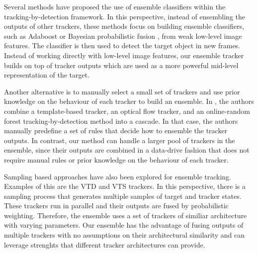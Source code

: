 Several methods have proposed the use of ensemble classifiers within
the tracking-by-detection framework.
In this perspective, instead of ensembling the outputs of other trackers,
these methods focus on building ensemble classifiers,
such as Adaboost \cite{Avidan2007} or Bayesian probabilistic fusion \cite{Bai2013},
from weak low-level image features.
The classifier is then used to detect the target object in
new frames. Instead of working directly with low-level image features,
our ensemble tracker builds on top of tracker outputs
which are used as a more powerful mid-level representation of the target.

Another alternative is to manually select a small set of trackers and use
prior knowledge on the behaviour of each tracker to build an ensemble.
In \cite{Santner2010a}, the authors combine a template-based tracker,
an optical flow tracker, and an online-random forest tracking-by-detection
method into a cascade.
In that case, the authors manually predefine a set of rules that decide
how to ensemble the tracker outputs. In contrast, our method can handle
a larger pool of trackers in the ensemble, since their outputs are combined
in a data-drive fashion that does not require manual rules or prior knowledge
on the behaviour of each tracker.


Sampling based approaches have also been explored for ensemble tracking.
Examples of this are the VTD \cite{Kwon2009} and
VTS \cite{Kwon2011a} trackers.
In this perspective, there is a sampling process that generates
multiple samples of target and tracker states. These trackers run in parallel
and their outputs are fused by probabilistic weighting. Therefore,
the ensemble uses a set of trackers of similiar architecture
with varying parameters. Our ensemble has the advantage of fusing outputs
of multiple trackers with no assumptions on their architectural similarity
and can leverage strenghts that different tracker architectures can provide.

